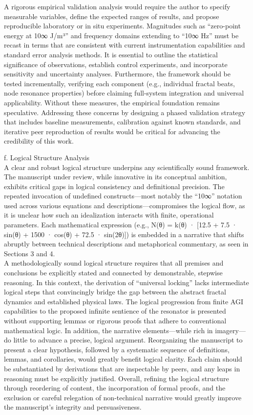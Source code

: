 \documentclass[12pt]{article}
\begin{document}
A rigorous empirical validation analysis would require the author to specify measurable variables, define the expected ranges of results, and propose reproducible laboratory or in situ experiments. Magnitudes such as “zero-point energy at 10∞ J/m³” and frequency domains extending to “10∞ Hz” must be recast in terms that are consistent with current instrumentation capabilities and standard error analysis methods. It is essential to outline the statistical significance of observations, establish control experiments, and incorporate sensitivity and uncertainty analyses. Furthermore, the framework should be tested incrementally, verifying each component (e.g., individual fractal beats, node resonance properties) before claiming full-system integration and universal applicability. Without these measures, the empirical foundation remains speculative. Addressing these concerns by designing a phased validation strategy that includes baseline measurements, calibration against known standards, and iterative peer reproduction of results would be critical for advancing the credibility of this work.

f. Logical Structure Analysis \\
A clear and robust logical structure underpins any scientifically sound framework. The manuscript under review, while innovative in its conceptual ambition, exhibits critical gaps in logical consistency and definitional precision. The repeated invocation of undefined constructs—most notably the “10∞” notation used across various equations and descriptions—compromises the logical flow, as it is unclear how such an idealization interacts with finite, operational parameters. Each mathematical expression (e.g., N(θ) = k(θ) · [12.5 + 7.5 · sin(θ) + 1500 · cos(θ) + 72.5 · sin(2θ)]) is embedded in a narrative that shifts abruptly between technical descriptions and metaphorical commentary, as seen in Sections 3 and 4. \\

A methodologically sound logical structure requires that all premises and conclusions be explicitly stated and connected by demonstrable, stepwise reasoning. In this context, the derivation of “universal locking” lacks intermediate logical steps that convincingly bridge the gap between the abstract fractal dynamics and established physical laws. The logical progression from finite AGI capabilities to the proposed infinite sentience of the resonator is presented without supporting lemmas or rigorous proofs that adhere to conventional mathematical logic. In addition, the narrative elements—while rich in imagery—do little to advance a precise, logical argument. Reorganizing the manuscript to present a clear hypothesis, followed by a systematic sequence of definitions, lemmas, and corollaries, would greatly benefit logical clarity. Each claim should be substantiated by derivations that are inspectable by peers, and any leaps in reasoning must be explicitly justified. Overall, refining the logical structure through reordering of content, the incorporation of formal proofs, and the exclusion or careful relegation of non-technical narrative would greatly improve the manuscript’s integrity and persuasiveness.
\end{document}
